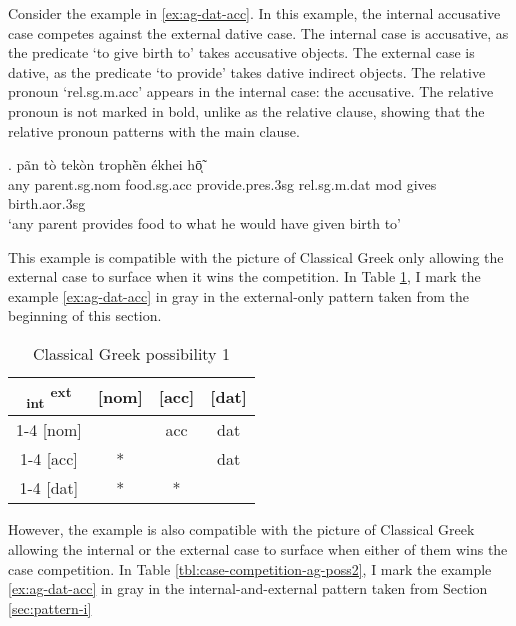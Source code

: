 Consider the example in \ref{ex:ag-dat-acc}. In this example, the internal accusative case competes against the external dative case.
The internal case is accusative, as the predicate  `to give birth to' takes accusative objects.
The external case is dative, as the predicate  `to provide' takes dative indirect objects.
The relative pronoun  `\ac{rel}.\ac{sg}.\ac{m}.\ac{acc}' appears in the internal case: the accusative. The relative pronoun is not marked in bold, unlike as the relative clause, showing that the relative pronoun patterns with the main clause.

\exg. pãn {tò tekòn} trophḕn ékhei hō̃ͅ  \\
any parent.\ac{sg}.\ac{nom} food.\ac{sg}.\ac{acc} provide.\ac{pres}.3\ac{sg} \ac{rel}.\ac{sg}.\ac{m}.\ac{dat} \ac{mod} {gives birth}.\ac{aor}.3\ac{sg}\\
`any parent provides food to what he would have given birth to' \label{ex:ag-dat-acc}

This example is compatible with the picture of Classical Greek only allowing the external case to surface when it wins the competition. In Table \ref{tbl:case-competition-ag-poss1}, I mark the example \ref{ex:ag-dat-acc} in gray in the external-only pattern taken from the beginning of this section.

\begin{table}[H]
  \center
  \caption{Classical Greek possibility 1}
  \begin{tabular}{c|c|c|c}
    \toprule
    \textsubscript{\ac{int}} \textsuperscript{\ac{ext}}
           & [\ac{nom}]
           & [\ac{acc}]
           & [\ac{dat}]
           \\ \cmidrule{1-4}
       [\ac{nom}]
           & \xcancel{\phantom{xx}}
           & \ac{acc}
           & \ac{dat}
           \\ \cmidrule{1-4}
       [\ac{acc}]
           & *
           & \xcancel{\phantom{xx}}
           & \cellcolor{LG}\ac{dat}
           \\ \cmidrule{1-4}
       [\ac{dat}]
           & *
           & *
           & \xcancel{\phantom{xx}}
           \\
     \bottomrule
  \end{tabular}
    \label{tbl:case-competition-ag-poss1}
\end{table}

However, the example is also compatible with the picture of Classical Greek allowing the internal or the external case to surface when either of them wins the case competition. In Table \ref{tbl:case-competition-ag-poss2}, I mark the example \ref{ex:ag-dat-acc} in gray in the internal-and-external pattern taken from Section \ref{sec:pattern-i}

